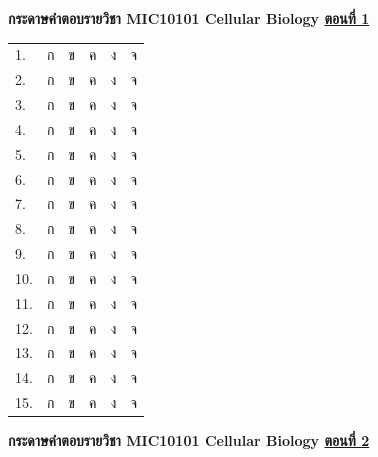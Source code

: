 \documentclass[12pt, a4paper]{exam}
\begin{document}
\newpage
\vspace{0.5cm}
\begin{center}
\textbf{กระดาษคำตอบรายวิชา MIC10101 Cellular Biology \underline{ตอนที่ 1}}
\label{ans_part_1}
\end{center}
\vspace{0.5cm}
\begin{center}
\setlength{\tabcolsep}{20pt}
\renewcommand{\arraystretch}{1.35}
\begin{tabular}{l c c c c c}
1. & ก & ข & ค & ง & จ \\
2. & ก & ข & ค & ง & จ \\
3. & ก & ข & ค & ง & จ \\
4. & ก & ข & ค & ง & จ \\
5. & ก & ข & ค & ง & จ \\
6. & ก & ข & ค & ง & จ \\
7. & ก & ข & ค & ง & จ \\
8. & ก & ข & ค & ง & จ \\
9. & ก & ข & ค & ง & จ \\
10. & ก & ข & ค & ง & จ \\
11. & ก & ข & ค & ง & จ \\
12. & ก & ข & ค & ง & จ \\
13. & ก & ข & ค & ง & จ \\
14. & ก & ข & ค & ง & จ \\
15. & ก & ข & ค & ง & จ \\
\end{tabular}
\end{center}
\newpage
\vspace{0.5cm}
\begin{center}
\textbf{กระดาษคำตอบรายวิชา MIC10101 Cellular Biology \underline{ตอนที่ 2}}
\label{ans_part_2}
\end{center}
\vspace{0.5cm}
\end{document}
